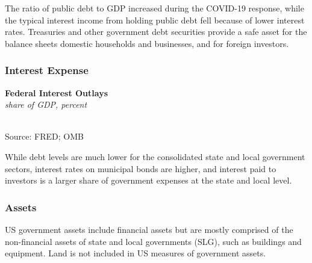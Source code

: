 \documentclass{report}
\makeatletter
\newcommand{\tbllink}[1]{\href{https://raw.githubusercontent.com/bdecon/US-chartbook/master/chartbook/data/#1}{\faTable}}
\newcommand*\short[1]{\expandafter\@gobbletwo\number\numexpr#1\relax}
\newcommand{\shdateaxisticks}{
		date coordinates in=x, axis line style={draw=none},
		xmax={2021-06-15},
		max space between ticks=40,	    
		xtick={{1990-01-01}, {1995-01-01}, {2000-01-01}, 
			{2005-01-01}, {2010-01-01}, {2015-01-01}, {2020-01-01}},
		minor xtick={},
		enlarge y limits={0.06}, enlarge x limits={0.01},
		}
\newcommand{\thickline}[4]{\addplot[ultra thick, no markers, color=#1] 
		table [x=#2, y=#3, col sep=comma] {#4};	}
\newcommand{\rbars}{
		\fill[color=black!10] (axis cs:{1990-07-01},\pgfkeysvalueof{/pgfplots/ymin}) rectangle 
			(axis cs:{1991-03-01}, \pgfkeysvalueof{/pgfplots/ymax});
		\fill[color=black!10] (axis cs:{2007-12-01},\pgfkeysvalueof{/pgfplots/ymin}) rectangle 
			(axis cs:{2009-07-01}, \pgfkeysvalueof{/pgfplots/ymax});
		\fill[color=black!10] (axis cs:{2001-03-01},\pgfkeysvalueof{/pgfplots/ymin}) rectangle 
			(axis cs:{2001-11-01}, \pgfkeysvalueof{/pgfplots/ymax});
		\fill[color=black!10] (axis cs:{2020-02-01},\pgfkeysvalueof{/pgfplots/ymin}) rectangle 
			(axis cs:{2021-06-15}, \pgfkeysvalueof{/pgfplots/ymax});}
\makeatother
\begin{document}
{\begin{minipage}{0.76\textwidth}
\small The ratio of public debt to GDP increased during the COVID-19 response, while the typical interest income from holding public debt fell because of lower interest rates. Treasuries and other government debt securities provide a safe asset for the balance sheets domestic households and businesses, and for foreign investors.
\end{minipage}
\subsubsection*{\color{black!70} \seriffont Interest Expense}
\begin{minipage}{0.33\textwidth}
\small 
\end{minipage} \hspace{6mm} \begin{minipage}{0.38\textwidth}
\normalsize \textbf{Federal Interest Outlays}\\
\footnotesize{\textit{share of GDP, percent}}\\
\hspace*{-2mm} \\
\footnotesize{Source: FRED; OMB} \hfill \tbllink{fedintexp.csv}
\end{minipage} 
\vspace{1mm}

\begin{minipage}{0.76\textwidth}
\small While debt levels are much lower for the consolidated state and local government sectors, interest rates on municipal bonds are higher, and interest paid to investors is a larger share of government expenses at the state and local level.
\end{minipage}
\newpage
\begin{minipage}{0.76\textwidth}
\subsubsection*{\color{black!70} \seriffont Assets}
\small US government assets include financial assets but are mostly comprised of the non-financial assets of state and local governments (SLG), such as buildings and equipment. Land is not included in US measures of government assets. 


\end{minipage}}
\end{document}
